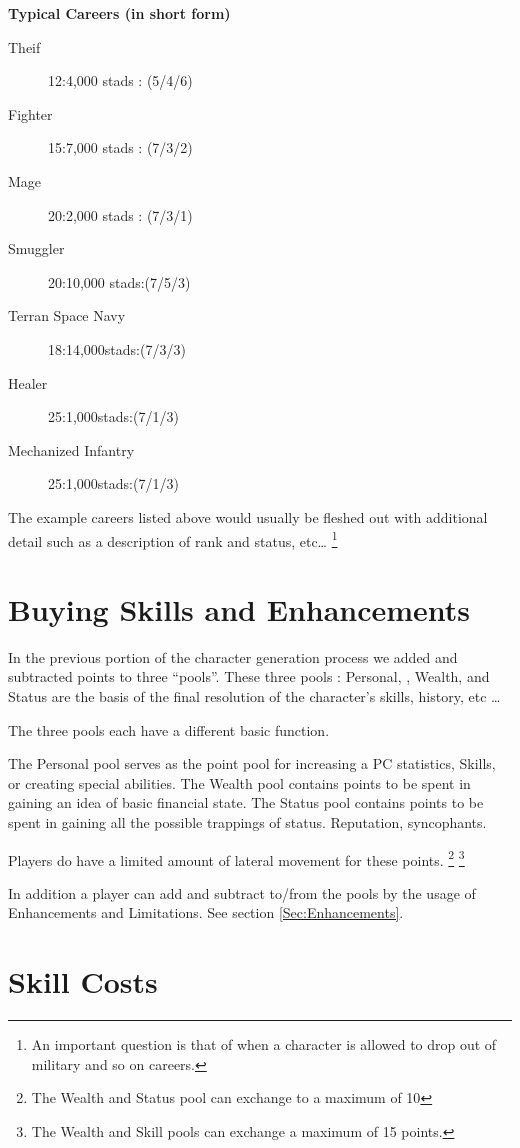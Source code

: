 {\bf Typical Careers (in short form)}
	\begin{description}
		\item[Theif]
		        12:4,000 stads : (5/4/6)
		\item[Fighter]
		        15:7,000 stads : (7/3/2)
		\item[Mage]
		        20:2,000 stads : (7/3/1)
		\item[Smuggler]
		       20:10,000 stads:(7/5/3)
		\item[Terran Space Navy]
		       18:14,000stads:(7/3/3)
		\item[Healer]
		       25:1,000stads:(7/1/3)
		\item[Mechanized Infantry]
		       25:1,000stads:(7/1/3)
	\end{description}

The example careers listed above would usually be fleshed out with
additional detail such as a description of rank and status, etc\dots
\footnote{An important question is that of when a character is
allowed to drop out of military and so on careers.}

\section{Buying Skills and Enhancements}

In the previous portion of the character generation process we added
and subtracted points to three ``pools''. These three pools : Personal,
, Wealth, and Status are the basis of the final resolution of
the character's skills, history, etc \dots

The three pools each have a different basic function.

The Personal pool serves as the point pool for
increasing a PC statistics, Skills,  or creating special abilities.
The Wealth pool contains points to be spent in gaining an idea of
basic financial state.
The Status pool contains points to be spent in gaining all the
possible trappings of status. Reputation, syncophants.

Players do have a limited amount of lateral movement for these
points. \footnote{The Wealth and Status pool can exchange to a maximum of 10}
\footnote{The Wealth and Skill pools can exchange a maximum of 15 points.}

In addition a player can add and subtract to/from the pools by the
usage of Enhancements and Limitations. See section \ref{Sec:Enhancements}.

\section{Skill Costs}

